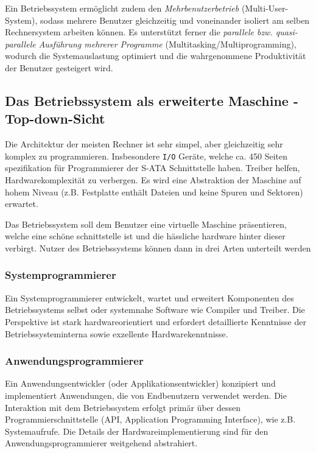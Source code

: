 Ein Betriebssystem ermöglicht zudem den \textit{Mehrbenutzerbetrieb}
(Multi-User-System), sodass mehrere Benutzer gleichzeitig und voneinander
isoliert am selben Rechnersystem arbeiten können. Es unterstützt ferner die
\textit{parallele bzw. quasi-parallele Ausführung mehrerer Programme}
(Multitasking/Multiprogramming), wodurch die Systemauslastung optimiert und die
wahrgenommene Produktivität der Benutzer gesteigert wird.

\subsection{Das Betriebssystem als erweiterte Maschine - Top-down-Sicht}

Die Architektur der meisten Rechner ist sehr simpel, aber gleichzeitig sehr
komplex zu programmieren. Insbesondere \texttt{I/O} Geräte, welche ca. 450
Seiten spezifikation für Programmierer der S-ATA Schnittstelle haben. Treiber
helfen, Hardwarekomplexität zu verbergen. Es wird eine Abstraktion der Maschine
auf hohem Niveau (z.B. Festplatte enthält Dateien und keine Spuren und
Sektoren) erwartet.

Das Betriebssystem soll dem Benutzer eine virtuelle Maschine präsentieren,
welche eine schöne schnittstelle ist und die hässliche hardware hinter dieser
verbirgt. Nutzer des Betriebssystems können dann in drei Arten unterteilt
werden

\subsubsection*{Systemprogrammierer}
Ein Systemprogrammierer entwickelt, wartet und erweitert Komponenten des Betriebssystems selbst oder systemnahe Software wie Compiler und Treiber. Die Perspektive ist stark hardwareorientiert und erfordert detaillierte Kenntnisse der Betriebssysteminterna sowie exzellente Hardwarekenntnisse.

\subsubsection*{Anwendungsprogrammierer}
Ein Anwendungsentwickler (oder Applikationsentwickler) konzipiert und implementiert Anwendungen, die von Endbenutzern verwendet werden. Die Interaktion mit dem Betriebssystem erfolgt primär über dessen Programmierschnittstelle (API, Application Programming Interface), wie z.B. Systemaufrufe. Die Details der Hardwareimplementierung sind für den Anwendungsprogrammierer weitgehend abstrahiert.

